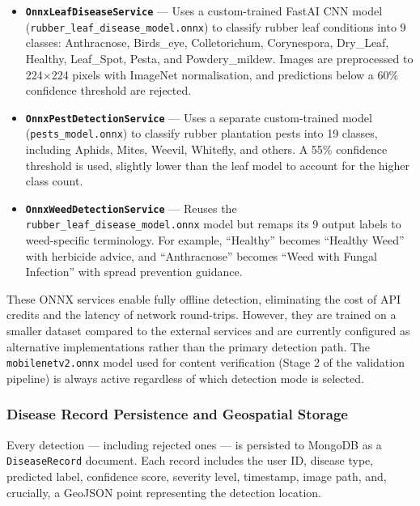 \begin{itemize}
    \item \textbf{\texttt{OnnxLeafDiseaseService}} --- Uses a custom-trained FastAI CNN model (\texttt{rubber\_leaf\_disease\_model.onnx}) to classify rubber leaf conditions into 9 classes: Anthracnose, Birds\_eye, Colletorichum, Corynespora, Dry\_Leaf, Healthy, Leaf\_Spot, Pesta, and Powdery\_mildew. Images are preprocessed to 224$\times$224 pixels with ImageNet normalisation, and predictions below a 60\% confidence threshold are rejected.

    \item \textbf{\texttt{OnnxPestDetectionService}} --- Uses a separate custom-trained model (\texttt{pests\_model.onnx}) to classify rubber plantation pests into 19 classes, including Aphids, Mites, Weevil, Whitefly, and others. A 55\% confidence threshold is used, slightly lower than the leaf model to account for the higher class count.

    \item \textbf{\texttt{OnnxWeedDetectionService}} --- Reuses the \texttt{rubber\_leaf\_disease\_model.onnx} model but remaps its 9 output labels to weed-specific terminology. For example, ``Healthy'' becomes ``Healthy Weed'' with herbicide advice, and ``Anthracnose'' becomes ``Weed with Fungal Infection'' with spread prevention guidance.
\end{itemize}

These ONNX services enable fully offline detection, eliminating the cost of API credits and the latency of network round-trips. However, they are trained on a smaller dataset compared to the external services and are currently configured as alternative implementations rather than the primary detection path. The \texttt{mobilenetv2.onnx} model used for content verification (Stage 2 of the validation pipeline) is always active regardless of which detection mode is selected.

\subsubsection{Disease Record Persistence and Geospatial Storage}

Every detection --- including rejected ones --- is persisted to MongoDB as a \texttt{DiseaseRecord} document. Each record includes the user ID, disease type, predicted label, confidence score, severity level, timestamp, image path, and, crucially, a GeoJSON point representing the detection location.

